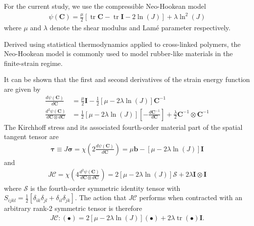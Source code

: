 \documentclass[times,doublespace]{nmeauth}
\DeclareMathOperator{\trace}{tr}
\newcommand{\changeJP}[1]{#1}
\begin{document}
For the current study, we use the compressible Neo-Hookean model
\begin{gather}
\psi \left( \mathbf{C} \right)
  = \frac{\mu}{2} \left[ \trace{\mathbf{C}} - \trace{\mathbf{I}} - 2 \ln\left( J \right) \right]
  + \lambda \ln^{2}\left( J \right)
\end{gather}
where $\mu$ and $\lambda$ denote the shear modulus and Lam\'{e} parameter respectively.
\changeJP{
Derived using statistical thermodynamics applied to cross-linked polymers, the Neo-Hookean model \cite{Treloar1975a,Treloar1976a} is commonly used to model rubber-like materials in the finite-strain regime.
}
It can be shown that the first and second derivatives of the strain energy function are given by
\begin{align}
\frac{d \psi \left( \mathbf{C} \right)}{d \mathbf{C}}
  &= \frac{\mu}{2} \mathbf{I} - \frac{1}{2} \left[ \mu - 2\lambda\ln\left( J \right) \right] \mathbf{C}^{-1} \\
\frac{d^{2} \psi \left( \mathbf{C} \right)}{d \mathbf{C} \otimes d \mathbf{C}}
  &= \frac{1}{2}\left[ \mu - 2\lambda\ln\left( J \right) \right] \left[ - \frac{d \mathbf{C}^{-1}}{d \mathbf{C}} \right]
  + \frac{\lambda}{2} \mathbf{C}^{-1} \otimes \mathbf{C}^{-1}
\end{align}
The Kirchhoff stress and its associated fourth-order material part of the spatial tangent tensor are
\begin{gather}
\boldsymbol{\tau}
  \equiv J \boldsymbol{\sigma}
  = \chi\left( 2 \frac{d \psi \left( \mathbf{C} \right)}{d \mathbf{C}} \right)
  = \mu \mathbf{b} - \left[ \mu - 2\lambda\ln\left( J \right) \right] \mathbf{I}
\end{gather}
and
\begin{gather}
J \boldsymbol{\mathcal{C}}
  = \chi\left( 4 \frac{d^{2} \psi \left( \mathbf{C} \right)}{d \mathbf{C} \otimes d \mathbf{C}} \right)
  = 2 \left[ \mu - 2\lambda\ln\left( J \right) \right] \boldsymbol{\mathcal{S}}
  + 2 \lambda \mathbf{I} \otimes \mathbf{I}
\end{gather}
where $\boldsymbol{\mathcal{S}}$ is the fourth-order symmetric identity tensor
with $S_{ijkl}=\frac{1}{2}\left[\delta_{ik}\delta_{jl}+\delta_{il}\delta_{jk}\right]$.
The action that $J \boldsymbol{\mathcal{C}}$ performs when contracted with an arbitrary rank-2 symmetric tensor is therefore
\begin{gather}
J \boldsymbol{\mathcal{C}} : \left( \bullet \right)
  = 2 \left[ \mu - 2\lambda\ln\left( J \right) \right] \left( \bullet \right)
  + 2 \lambda \trace\left( \bullet \right) \mathbf{I}.
\label{eq:simplified_action}
\end{gather}
\end{document}
